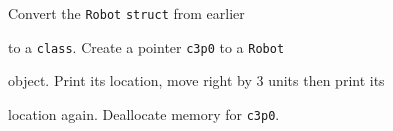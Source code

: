 Convert the \texttt{Robot} \texttt{struct} from earlier

to a \texttt{class}. Create a pointer \texttt{c3p0} to a \texttt{Robot}

object. Print its location, move right by 3 units then print its

location again. Deallocate memory for \texttt{c3p0}.

